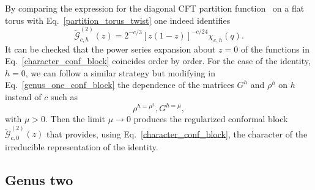 \documentclass[a4paper,11pt]{article}
\begin{document}
By comparing the expression for the diagonal CFT partition function~\cite{Cappelli, Cappelli2} on a flat torus with Eq.~\eqref{partition_torus_twist} one indeed identifies 
\begin{equation}\label{character_conf_block}
 \tilde{\mathcal{G}}_{c, h}^{(2)}(z)=2^{-c/3}[z(1-z)]^{-c/24}\chi_{c,h}(q).
\end{equation}
It can be checked that the power series expansion about $z=0$ of the functions in Eq.~\eqref{character_conf_block} coincides order by order. For the case of the identity, $h=0$, we can follow a similar strategy but 
modifying in Eq.~\eqref{genus_one_conf_block} the dependence of the matrices $G^h$ and 
$\rho^h$ on $h$ instead of $c$ such as
\begin{equation}\label{regularization_identity}
 \rho^{h=\mu^2}, G^{h=\mu},
\end{equation}
with $\mu>0$. Then the limit $\mu\to 0$ produces the regularized 
conformal block $\tilde{\mathcal{G}}_{c, 0}^{(2)}(z)$ that
provides, using Eq.~\eqref{character_conf_block}, the  character of the irreducible representation of the identity.

\subsection{Genus two}
\end{document}

